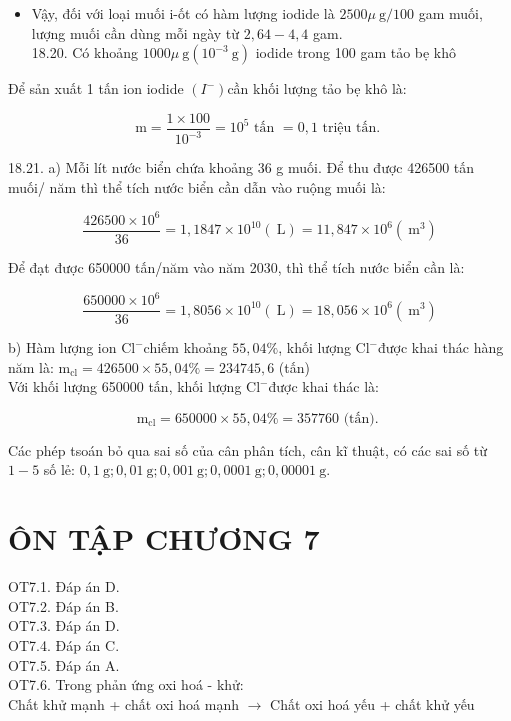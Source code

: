 \documentclass[10pt]{article}
\begin{document}
\begin{itemize}
  \item Vậy, đối với loại muối i-ốt có hàm lượng iodide là $2500 \mu \mathrm{~g} / 100$ gam muối, lượng muối cần dùng mỗi ngày từ $2,64-4,4$ gam.\\
18.20. Có khoảng $1000 \mu \mathrm{~g}\left(10^{-3} \mathrm{~g}\right)$ iodide trong 100 gam tảo bẹ khô
\end{itemize}

Để sản xuất 1 tấn ion iodide $\left(I^{-}\right)$cần khối lượng tảo bẹ khô là:

$$
\mathrm{m}=\frac{1 \times 100}{10^{-3}}=10^{5} \text { tấn }=0,1 \text { triệu tấn. }
$$

18.21. a) Mỗi lít nước biển chứa khoảng 36 g muối. Để thu được 426500 tấn muối/ năm thì thể tích nước biển cần dẫn vào ruộng muối là:

$$
\frac{426500 \times 10^{6}}{36}=1,1847 \times 10^{10}(\mathrm{~L})=11,847 \times 10^{6}\left(\mathrm{~m}^{3}\right)
$$

Để đạt được 650000 tấn/năm vào năm 2030, thì thể tích nước biển cần là:

$$
\frac{650000 \times 10^{6}}{36}=1,8056 \times 10^{10}(\mathrm{~L})=18,056 \times 10^{6}\left(\mathrm{~m}^{3}\right)
$$

b) Hàm lượng ion $\mathrm{Cl}^{-}$chiếm khoảng $55,04 \%$, khối lượng $\mathrm{Cl}^{-}$được khai thác hàng năm là: $\mathrm{m}_{\mathrm{cl}}=426500 \times 55,04 \%=234745,6$ (tấn)\\
Với khối lượng 650000 tấn, khối lượng $\mathrm{Cl}^{-}$được khai thác là:

$$
\mathrm{m}_{\mathrm{cl}}=650000 \times 55,04 \%=357760 \text { (tấn). }
$$

Các phép tsoán bỏ qua sai số của cân phân tích, cân kĩ thuật, có các sai số từ $1-5$ số lẻ: $0,1 \mathrm{~g} ; 0,01 \mathrm{~g} ; 0,001 \mathrm{~g} ; 0,0001 \mathrm{~g} ; 0,00001 \mathrm{~g}$.

\section*{ÔN TẬP CHƯƠNG 7}
OT7.1. Đáp án D.\\
OT7.2. Đáp án B.\\
OT7.3. Đáp án D.\\
OT7.4. Đáp án C.\\
OT7.5. Đáp án A.\\
OT7.6. Trong phản ứng oxi hoá - khử:\\
Chất khử mạnh + chất oxi hoá mạnh $\rightarrow$ Chất oxi hoá yếu + chất khử yếu
\end{document}
